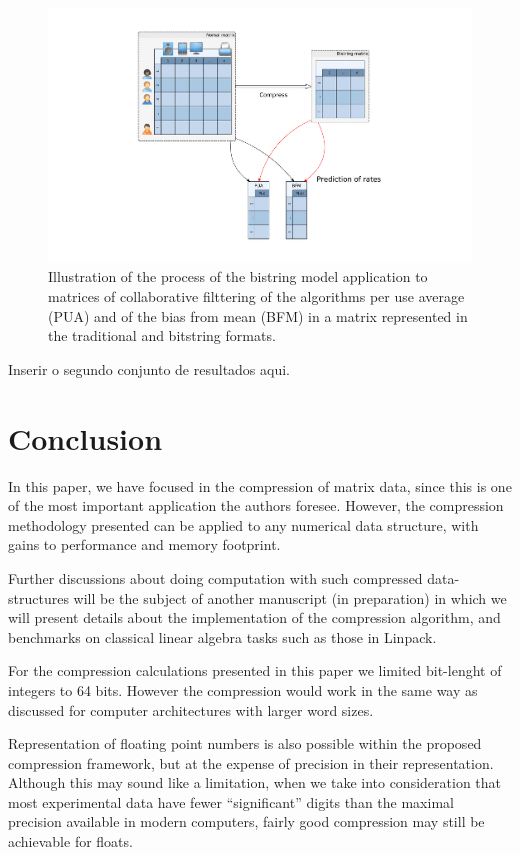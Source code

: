 \documentclass[10pt]{article}
\begin{document}
\begin{figure}[h]
  \centering
  \includegraphics[scale=0.4,trim=5cm 0cm 5cm 0cm,clip]{cf}
  \caption{Illustration of the process of the bistring model application to matrices of collaborative filttering of the 
algorithms per use average (PUA) and of the bias from mean (BFM) in a matrix represented in the traditional and 
bitstring formats.}
  \label{cf}
\end{figure}

Inserir o segundo conjunto de resultados aqui.



\section*{Conclusion}

In this paper, we have focused in the compression of matrix data, since this is
one of the most important application the authors foresee. However, the
compression methodology presented can be applied to any numerical data
structure, with gains to performance and memory footprint\cite{teseCrysttian}. 

Further discussions about doing computation with such compressed data-structures
will be the subject of another manuscript (in preparation) in which we will
present details about the implementation of the compression algorithm, and
benchmarks on classical linear algebra tasks such as those in
Linpack\cite{dongarra1979linpack}.

For the compression calculations presented in this paper we limited bit-lenght of integers to 64 bits. However the 
compression would work in the same way as discussed for computer architectures with larger word sizes. 

Representation of floating point numbers is also possible within the proposed compression framework, but at the expense 
of precision in their representation. Although this may sound like a limitation, when we take into consideration that 
most experimental data have fewer ``significant'' digits than the maximal precision available in modern computers, 
fairly good compression may still be achievable for floats. 
\end{document}

